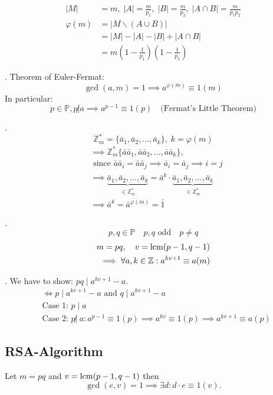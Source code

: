 \begin{align*}
  |M| &= m, \; |A| = \frac{m}{p_1}, \; |B| = \frac{m}{p_2}, \;
    |A \cap B| = \frac{m}{p_1p_2}\\
  \varphi(m)
    &= | M \backslash(A\cup B) | \\
    &= |M| - |A| - |B| + | A \cap B|\\
    &= m \left(1- \frac{1}{p_1} \right) \left(1- \frac{1}{p_2} \right)
\end{align*}

\Theorem.
Theorem of Euler-Fermat:
\[
  \gcd(a,m) = 1 \implies a ^{\varphi(m)} \equiv 1 (m)
\]
In particular:
\[
  p \in \mathbb{P}, p \not| a \implies a^{p-1} \equiv 1 (p) \quad
  \text{(Fermat's Little Theorem)}
\]

\Proof.
\[
  \mathbb{Z}_m^{*} = \{\bar{a}_1, \bar{a}_2, \ldots, \bar{a}_k \}, \;k = \varphi(m)
\]
\begin{align*}
  &\implies \mathbb{Z}_m^{*} \{\bar{a}\bar{a}_1, \bar{a}\bar{a}_2, \ldots, \bar{a}\bar{a}_k \}, \\
  &\text{ since } \bar{a}\bar{a}_i = \bar{a}\bar{a}_j
    \implies \bar{a}_i = \bar{a}_j \implies i = j \\
  &\implies \underbrace{\bar{a}_1, \bar{a}_2, \ldots, \bar{a}_k}_
        {\in \mathbb{Z}_m^{*}}
      = \bar{a}^k \cdot \underbrace{\bar{a}_1, \bar{a}_2, \ldots, \bar{a}_k}_
        {\in \mathbb{Z}_m^{*}} \\
  &\implies \bar{a}^k = \bar{a}^{\varphi(m)} = \bar{1}
\end{align*}

\Theorem.
\[
  p, q \in \mathbb{P} \quad p,q \text{ odd} \quad p \neq q
\]
\begin{align*}
  m = pq, \quad v = \operatorname{lcm}(p-1, q-1) \\
  \implies \forall a,k \in \mathbb{Z}: a^{kv + 1} \equiv a(m)
\end{align*}

\Proof.
We have to show: $pq \mid a ^{kv +1} - a$.
\begin{align*}
  &\Leftrightarrow p \mid a ^{kv +1} - a \text{ and } q \mid a ^{kv +1} - a\\
  &\text{Case 1: } p \mid a \\
  &\text{Case 2: } p \not|~ a:
    a^{p-1} \equiv 1 (p) \implies a^{kv} \equiv 1(p) \implies a^{kv+1} \equiv a(p)
\end{align*}

\subsection{RSA-Algorithm}
Let $m = pq$ and $v = \operatorname{lcm}(p-1, q-1)$ then
\[
  \gcd(e,v) = 1 \implies \exists d : d \cdot e \equiv 1 (v).
\]

